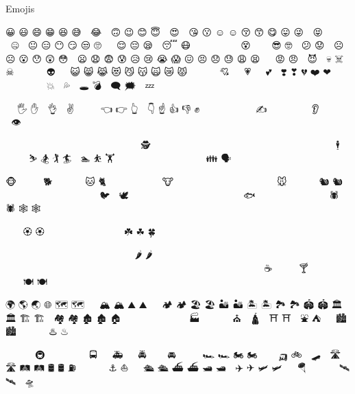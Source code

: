 \documentclass {article}
\begin{document}
{Emojis\fontemoji\par
😀  😃  😄  😁  😆  😅  🤣  😂  🙂  🙃  😉  😊  😇  🥰  😍  🤩  😘  😗  ☺️   ☺   😚  😙
😋  😛  😜  🤪  😝  🤑  🤗  🤭  🤫  🤔  🤐  🤨  😐  😑  😶  😏  😒  🙄  😬  🤥  😌  😔
😪  🤤  😴  😷  🤒  🤕  🤢  🤮  🤧  🥵  🥶  🥴  😵  🤯  🤠  🥳  😎  🤓  🧐  😕  😟  🙁
☹️   ☹   😮  😯  😲  😳  🥺  😦  😧  😨  😰  😥  😢  😭  😱  😖  😣  😞  😓  😩  😫  🥱
😤  😡  😠  🤬  😈  👿  💀  ☠️   ☠   💩  🤡  👹  👺  👻  👽  👾  🤖  😺  😸  😹  😻  😼
😽  🙀  😿  😾  🙈  🙉  🙊  💋  💌  💘  💝  💖  💗  💓  💞  💕  💟  ❣️   ❣   💔  ❤️   ❤
🧡  💛  💚  💙  💜  🤎  🖤  🤍  💯  💢  💥  💫  💦  💨  🕳️   💣  💬  🗨   🗯️   💭  💤

👋  🤚  🖐️   ✋  🖖  👌  🤏  ✌️   🤞  🤟  🤘  🤙  👈  👉  👆  🖕  👇  ☝️   👍  👎  ✊  👊
🤛  🤜  👏  🙌  👐  🤲  🤝  🙏  ✍️   💅  🤳  💪  🦾  🦿  🦵  🦶  👂  🦻  👃  🧠  🦷  🦴
👀  👁️  👅  👄

👶  🧒  👦  👧  🧑  👱  👨  🧔  👩  🧓  👴  👵  🙍  🙎  🙅  🙆  💁  🙋  🧏  🙇  🤦  🤷
👮  🕵️   💂  👷  🤴  👸  👳  👲  🧕  🤵  👰  🤰  🤱  👼  🎅  🤶  🦸  🦹  🧙  🧚  🧛  🧜
🧝  🧞  🧟  💆  💇  🚶  🧍  🧎  🏃  💃  🕺  🕴️   👯  🧖  🧗  🤺  🏇  ⛷️   🏂  🏌️   🏄  🚣
🏊  ⛹️   🏋️   🚴  🚵  🤸  🤼  🤽  🤾  🤹  🧘  🛀  🛌  👭  👫  👬  💏  💑  👪  🗣️   👤  👥
👣  🏻  🏼  🏽  🏾  🏿  🦰  🦱  🦳  🦲

🐵  🐒  🦍  🦧  🐶  🐕  🦮  🐩  🐺  🦊  🦝  🐱  🐈  🦁  🐯  🐅  🐆  🐴  🐎  🦄  🦓  🦌
🐮  🐂  🐃  🐄  🐷  🐖  🐗  🐽  🐏  🐑  🐐  🐪  🐫  🦙  🦒  🐘  🦏  🦛  🐭  🐁  🐀  🐹
🐰  🐇  🐿️   🐿   🦔  🦇  🐻  🐨  🐼  🦥  🦦  🦨  🦘  🦡  🐾  🦃  🐔  🐓  🐣  🐤  🐥  🐦
🐧  🕊️   🦅  🦆  🦢  🦉  🦩  🦚  🦜  🐸  🐊  🐢  🦎  🐍  🐲  🐉  🦕  🦖  🐳  🐋  🐬  🐟
🐠  🐡  🦈  🐙  🐚  🐌  🦋  🐛  🐜  🐝  🐞  🦗  🕷️   🕷   🕸️    🕸  🦂  🦟  🦠

💐  🌸  💮  🏵️   🏵   🌹  🥀  🌺  🌻  🌼  🌷  🌱  🌲  🌳  🌴  🌵  🌾  🌿  ☘️   ☘   🍀  🍁
🍂  🍃

🍇  🍈  🍉  🍊  🍋  🍌  🍍  🥭  🍎  🍏  🍐  🍑  🍒  🍓  🥝  🍅  🥥  🥑  🍆  🥔  🥕  🌽
🌶️   🌶   🥒  🥬  🥦  🧄  🧅  🍄  🥜  🌰  🍞  🥐  🥖  🥨  🥯  🥞  🧇  🧀  🍖  🍗  🥩  🥓
🍔  🍟  🍕  🌭  🥪  🌮  🌯  🥙  🧆  🥚  🍳  🥘  🍲  🥣  🥗  🍿  🧈  🧂  🥫  🍱  🍘  🍙
🍚  🍛  🍜  🍝  🍠  🍢  🍣  🍤  🍥  🥮  🍡  🥟  🥠  🥡  🦀  🦞  🦐  🦑  🦪  🍦  🍧  🍨
🍩  🍪  🎂  🍰  🧁  🥧  🍫  🍬  🍭  🍮  🍯  🍼  🥛  ☕  🍵  🍶  🍾  🍷  🍸  🍹  🍺  🍻
🥂  🥃  🥤  🧃  🧉  🧊  🥢  🍽️   🍽   🍴  🥄  🔪  🏺

🌍  🌎  🌏  🌐  🗺️   🗺   🗾  🧭  🏔️   🏔   ⛰️   ⛰   🌋  🗻  🏕️   🏕   🏖️   🏖   🏜️   🏜   🏝️   🏝
🏞️   🏞   🏟️   🏟   🏛️   🏛   🏗️   🏗   🧱  🏘️   🏘   🏚️   🏚   🏠  🏡  🏢  🏣  🏤  🏥  🏦  🏨  🏩
🏪  🏫  🏬  🏭  🏯  🏰  💒  🗼  🗽  ⛪  🕌  🛕  🕍  ⛩️   ⛩   🕋  ⛲  ⛺  🌁  🌃  🏙️   🏙
🌄  🌅  🌆  🌇  🌉  ♨️   ♨   🎠  🎡  🎢  💈  🎪

🚂  🚃  🚄  🚅  🚆  🚇  🚈  🚉  🚊  🚝  🚞  🚋  🚌  🚍  🚎  🚐  🚑  🚒  🚓  🚔  🚕  🚖
🚗  🚘  🚙  🚚  🚛  🚜  🏎️   🏎   🏍️   🏍   🛵  🦽  🦼  🛺  🚲  🛴  🛹  🚏  🛣️   🛣   🛤️   🛤
🛢️   🛢   ⛽  🚨  🚥  🚦  🛑  🚧  ⚓  ⛵  🛶  🚤  🛳️   🛳   ⛴️   ⛴   🛥️   🛥   🚢  ✈️   ✈   🛩️
🛩   🛫  🛬  🪂  💺  🚁  🚟  🚠  🚡  🛰️   🛰   🚀  🛸

}
\end{document}
